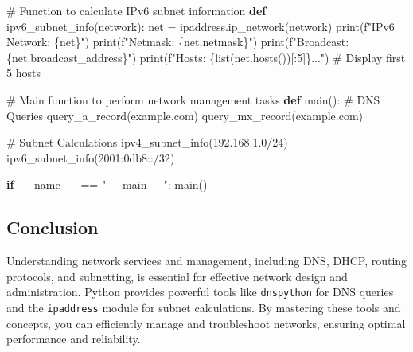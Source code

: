 \documentclass[
  letterpaper,
  DIV=11,
  numbers=noendperiod]{scrreprt}
\newenvironment{Shaded}{\begin{snugshade}}{\end{snugshade}}
\newcommand{\BuiltInTok}[1]{\textcolor[rgb]{0.00,0.23,0.31}{#1}}
\newcommand{\CommentTok}[1]{\textcolor[rgb]{0.37,0.37,0.37}{#1}}
\newcommand{\ControlFlowTok}[1]{\textcolor[rgb]{0.00,0.23,0.31}{\textbf{#1}}}
\newcommand{\DecValTok}[1]{\textcolor[rgb]{0.68,0.00,0.00}{#1}}
\newcommand{\KeywordTok}[1]{\textcolor[rgb]{0.00,0.23,0.31}{\textbf{#1}}}
\newcommand{\NormalTok}[1]{\textcolor[rgb]{0.00,0.23,0.31}{#1}}
\newcommand{\OperatorTok}[1]{\textcolor[rgb]{0.37,0.37,0.37}{#1}}
\newcommand{\SpecialCharTok}[1]{\textcolor[rgb]{0.37,0.37,0.37}{#1}}
\newcommand{\SpecialStringTok}[1]{\textcolor[rgb]{0.13,0.47,0.30}{#1}}
\newcommand{\StringTok}[1]{\textcolor[rgb]{0.13,0.47,0.30}{#1}}
\newcommand{\VariableTok}[1]{\textcolor[rgb]{0.07,0.07,0.07}{#1}}
\begin{document}
\begin{Shaded}
\begin{Highlighting}[]
\CommentTok{\# Function to calculate IPv6 subnet information}
\KeywordTok{def}\NormalTok{ ipv6\_subnet\_info(network):}
\NormalTok{    net }\OperatorTok{=}\NormalTok{ ipaddress.ip\_network(network)}
    \BuiltInTok{print}\NormalTok{(}\SpecialStringTok{f"IPv6 Network: }\SpecialCharTok{\{}\NormalTok{net}\SpecialCharTok{\}}\SpecialStringTok{"}\NormalTok{)}
    \BuiltInTok{print}\NormalTok{(}\SpecialStringTok{f"Netmask: }\SpecialCharTok{\{}\NormalTok{net}\SpecialCharTok{.}\NormalTok{netmask}\SpecialCharTok{\}}\SpecialStringTok{"}\NormalTok{)}
    \BuiltInTok{print}\NormalTok{(}\SpecialStringTok{f"Broadcast: }\SpecialCharTok{\{}\NormalTok{net}\SpecialCharTok{.}\NormalTok{broadcast\_address}\SpecialCharTok{\}}\SpecialStringTok{"}\NormalTok{)}
    \BuiltInTok{print}\NormalTok{(}\SpecialStringTok{f"Hosts: }\SpecialCharTok{\{}\BuiltInTok{list}\NormalTok{(net.hosts())[:}\DecValTok{5}\NormalTok{]}\SpecialCharTok{\}}\SpecialStringTok{..."}\NormalTok{)  }\CommentTok{\# Display first 5 hosts}

\CommentTok{\# Main function to perform network management tasks}
\KeywordTok{def}\NormalTok{ main():}
    \CommentTok{\# DNS Queries}
\NormalTok{    query\_a\_record(}\StringTok{\textquotesingle{}example.com\textquotesingle{}}\NormalTok{)}
\NormalTok{    query\_mx\_record(}\StringTok{\textquotesingle{}example.com\textquotesingle{}}\NormalTok{)}

    \CommentTok{\# Subnet Calculations}
\NormalTok{    ipv4\_subnet\_info(}\StringTok{\textquotesingle{}192.168.1.0/24\textquotesingle{}}\NormalTok{)}
\NormalTok{    ipv6\_subnet\_info(}\StringTok{\textquotesingle{}2001:0db8::/32\textquotesingle{}}\NormalTok{)}

\ControlFlowTok{if} \VariableTok{\_\_name\_\_} \OperatorTok{==} \StringTok{"\_\_main\_\_"}\NormalTok{:}
\NormalTok{    main()}
\end{Highlighting}
\end{Shaded}

\subsection{Conclusion}\label{conclusion-35}

Understanding network services and management, including DNS, DHCP,
routing protocols, and subnetting, is essential for effective network
design and administration. Python provides powerful tools like
\texttt{dnspython} for DNS queries and the \texttt{ipaddress} module for
subnet calculations. By mastering these tools and concepts, you can
efficiently manage and troubleshoot networks, ensuring optimal
performance and reliability.
\end{document}

